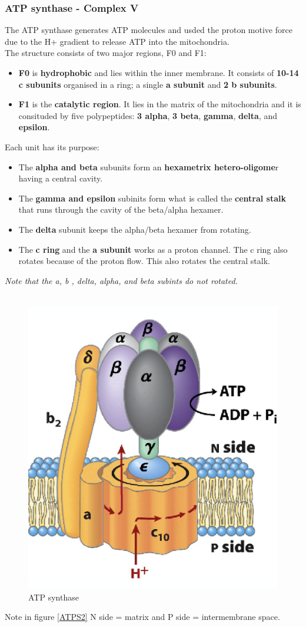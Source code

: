 \documentclass[../main.tex]{subfiles}
\begin{document}
\subsubsection{ATP synthase - Complex V}
The ATP synthase generates ATP molecules and usded the proton motive force due to the H+ gradient to release ATP into the mitochondria. \\
The structure consists of two major regions, F0 and F1: 
\begin{itemize}
	\item \textbf{F0} is \textbf{hydrophobic} and lies within the inner membrane. It consists of \textbf{10-14 c subunits} organised in a ring; a single \textbf{a subunit} and \textbf{2 b subunits}.  
	\item \textbf{F1} is the \textbf{catalytic region}. It lies in the matrix of the mitochondria and it is consituded by five polypeptides: \textbf{3 alpha}, \textbf{3 beta}, \textbf{gamma}, \textbf{delta}, and \textbf{epsilon}. 
\end{itemize}
\noindent Each unit has its purpose: 
\begin{itemize}
	\item The \textbf{alpha and beta} subunits form an \textbf{hexametrix hetero-oligome}r having a central cavity.
	\item The \textbf{gamma and epsilon} subinits form what is called  the \textbf{central stalk} that runs through the cavity of the beta/alpha hexamer.
	\item The \textbf{delta} subunit keeps the alpha/beta hexamer from rotating.
	\item The \textbf{c ring} and the \textbf{a subunit} works as a proton channel. The c ring also rotates because of the proton flow. This also rotates the  central stalk. 
\end{itemize} 
\noindent \textit{Note that the a, b , delta, alpha, and beta subints do not rotated.} \\
\\
\begin{figure}[H]
	\centering
	\includegraphics[width = 0.5 \textwidth]{ATPS1}
	\caption{ATP synthase}
	\label{ATPS1}
\end{figure}
\noindent Note in figure \ref{ATPS2} N side = matrix and P side = intermembrane space. 
\end{document}
